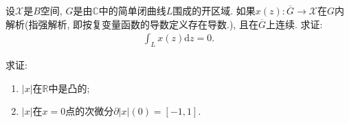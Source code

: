 \documentclass[../../main.tex]{subfiles}%
\begin{document}
\begin{proposition}[推广的Cauchy定理]
设$\mathscr{X}$是$B$空间, $G$是由$\mathbb{C}$中的简单闭曲线$L$围成的开区域. 如果$x(z): \overline{G} \to \mathscr{X}$在$G$内解析(指强解析, 即按复变量函数的导数定义存在导数.), 且在$\overline{G}$上连续. 求证: 
\begin{align*}
\int_L x(z) \mathrm{d}z = 0.
\end{align*}
\end{proposition}

\begin{example}
求证: 
\begin{enumerate}[(1)]
\item $|x|$在$\mathbb{R}$中是凸的;
\item $|x|$在$x=0$点的次微分$\partial|x|(0) = [-1,1]$.
\end{enumerate}
\end{example}
\end{document}
